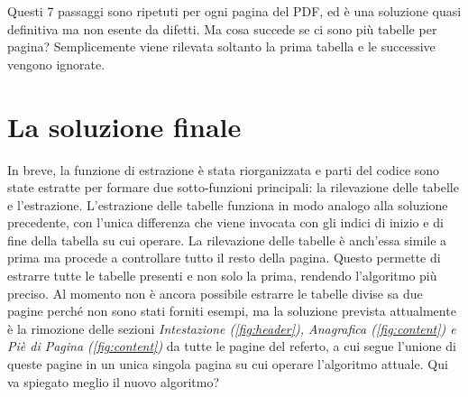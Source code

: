 Questi 7 passaggi sono ripetuti per ogni pagina del PDF, ed è una soluzione quasi definitiva ma non esente da difetti. Ma cosa succede se ci sono più tabelle per pagina? Semplicemente viene rilevata soltanto la prima tabella e le successive vengono ignorate.
\section{La soluzione finale}
In breve, la funzione di estrazione è stata riorganizzata e parti del codice sono state estratte per formare due sotto-funzioni principali: la rilevazione delle tabelle e l'estrazione.
L'estrazione delle tabelle funziona in modo analogo alla soluzione precedente, con l'unica differenza che viene invocata con gli indici di inizio e di fine della tabella su cui operare. La rilevazione delle tabelle è anch'essa simile a prima ma procede a controllare tutto il resto della pagina. Questo permette di estrarre tutte le tabelle presenti e non solo la prima, rendendo l'algoritmo più preciso.
Al momento non è ancora possibile estrarre le tabelle divise sa due pagine perché non sono stati forniti esempi, ma la soluzione prevista attualmente è la rimozione delle sezioni \textit{Intestazione (\ref{fig:header}), Anagrafica (\ref{fig:content}) e Piè di Pagina (\ref{fig:content})} da tutte le pagine del referto, a cui segue l'unione di queste pagine in un unica singola pagina su cui operare l'algoritmo attuale. 
Qui va spiegato meglio il nuovo algoritmo?






